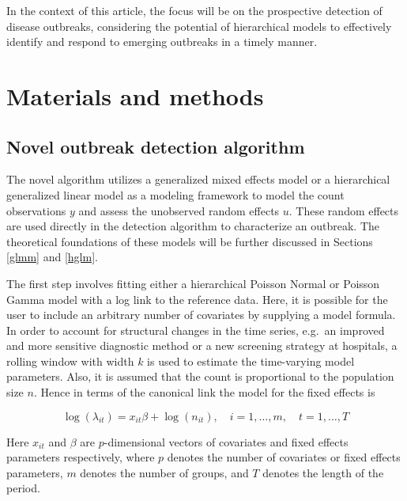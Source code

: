 \documentclass[preprint, 3p,
authoryear]{elsarticle} %
\begin{document}
In the context of this article, the focus will be on the prospective
detection of disease outbreaks, considering the potential of
hierarchical models to effectively identify and respond to emerging
outbreaks in a timely manner.

\hypertarget{materials-and-methods}{%
\section{Materials and methods}\label{materials-and-methods}}

\hypertarget{novel-outbreak-detection-algorithm}{%
\subsection{Novel outbreak detection
algorithm}\label{novel-outbreak-detection-algorithm}}

The novel algorithm utilizes a generalized mixed effects model or a
hierarchical generalized linear model as a modeling framework to model
the count observations \(y\) and assess the unobserved random effects
\(u\). These random effects are used directly in the detection algorithm
to characterize an outbreak. The theoretical foundations of these models
will be further discussed in Sections \ref{glmm} and \ref{hglm}.

The first step involves fitting either a hierarchical Poisson Normal or
Poisson Gamma model with a log link to the reference data. Here, it is
possible for the user to include an arbitrary number of covariates by
supplying a model formula. In order to account for structural changes in
the time series, e.g.~an improved and more sensitive diagnostic method
or a new screening strategy at hospitals, a rolling window with width
\(k\) is used to estimate the time-varying model parameters. Also, it is
assumed that the count is proportional to the population size \(n\).
Hence in terms of the canonical link the model for the fixed effects is

\begin{equation}
  \log(\lambda_{it}) = x_{it}\beta + \log(n_{it}), \quad i=1,\dots,m, \quad t=1,\dots,T
\end{equation}

Here \(x_{it}\) and \(\beta\) are \(p\)-dimensional vectors of
covariates and fixed effects parameters respectively, where \(p\)
denotes the number of covariates or fixed effects parameters, \(m\)
denotes the number of groups, and \(T\) denotes the length of the
period.
\end{document}
